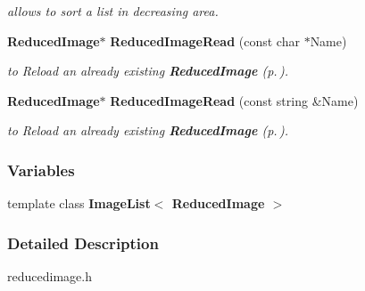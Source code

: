 \begin{CompactItemize}
\begin{CompactList}\small\item\em allows to sort a list in decreasing area.\item\end{CompactList}\item 
{}
{\bf Reduced\-Image}$\ast$ {\bf Reduced\-Image\-Read} (const char $\ast$Name)\label{reducedimage_cc_a31}

\begin{CompactList}\small\item\em to Reload an already existing {\bf Reduced\-Image} {\rm (p.\,\pageref{class_reducedimage})}.\item\end{CompactList}\item 
{}
{\bf Reduced\-Image}$\ast$ {\bf Reduced\-Image\-Read} (const string \&Name)\label{reducedimage_cc_a32}

\begin{CompactList}\small\item\em to Reload an already existing {\bf Reduced\-Image} {\rm (p.\,\pageref{class_reducedimage})}.\item\end{CompactList}\end{CompactItemize}
\subsubsection*{Variables}
\begin{CompactItemize}
\item 
{}
template class {\bf Image\-List$<$ Reduced\-Image $>$}\label{reducedimage_cc_a7}

\end{CompactItemize}


\subsubsection{Detailed Description}
 reducedimage.h



